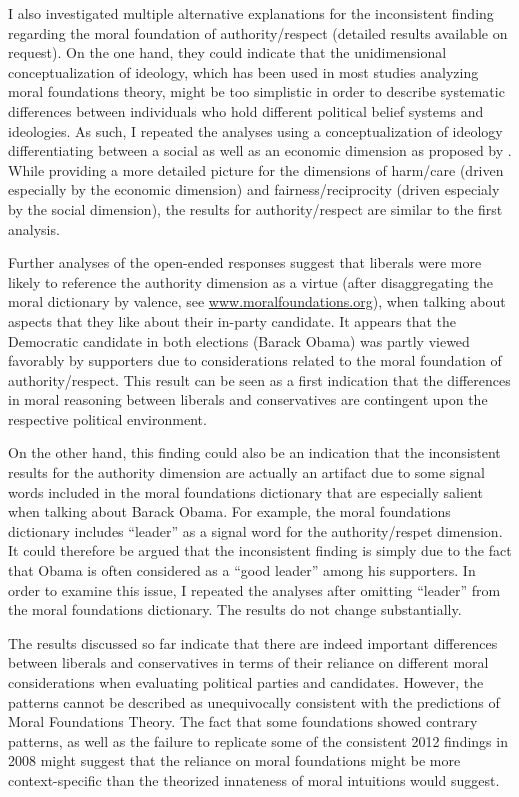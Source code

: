 \documentclass[12pt]{article}
\begin{document}
I also investigated multiple alternative explanations for the inconsistent finding regarding the moral foundation of authority/respect (detailed results available on request). On the one hand, they could indicate that the unidimensional conceptualization of ideology, which has been used in most studies analyzing moral foundations theory, might be too simplistic in order to describe systematic differences between individuals who hold different political belief systems and ideologies. As such, I repeated the analyses using a conceptualization of ideology differentiating between a social as well as an economic dimension as proposed by \citet{feldman2013understanding}. While providing a more detailed picture for the dimensions of harm/care (driven especially by the economic dimension) and fairness/reciprocity (driven especialy by the social dimension), the results for authority/respect are similar to the first analysis. 

Further analyses of the open-ended responses suggest that liberals were more likely to reference the authority dimension as a virtue (after disaggregating the moral dictionary by valence, see \url{www.moralfoundations.org}), when talking about aspects that they like about their in-party candidate. It appears that the Democratic candidate in both elections (Barack Obama) was partly viewed favorably by supporters due to considerations related to the moral foundation of authority/respect. This result can be seen as a first indication that the differences in moral reasoning between liberals and conservatives are contingent upon the respective political environment.

On the other hand, this finding could also be an indication that the inconsistent results for the authority dimension are actually an artifact due to some signal words included in the moral foundations dictionary that are especially salient when talking about Barack Obama. For example, the moral foundations dictionary includes ``leader'' as a signal word for the authority/respet dimension. It could therefore be argued that the inconsistent finding is simply due to the fact that Obama is often considered as a ``good leader'' among his supporters. In order to examine this issue, I repeated the analyses after omitting ``leader'' from the moral foundations dictionary. The results do not change substantially.

The results discussed so far indicate that there are indeed important differences between liberals and conservatives in terms of their reliance on different moral considerations when evaluating political parties and candidates. However, the patterns cannot be described as unequivocally consistent with the predictions of Moral Foundations Theory. The fact that some foundations showed contrary patterns, as well as the failure to replicate some of the consistent 2012 findings in 2008 might suggest that the reliance on moral foundations might be more context-specific than the theorized innateness of moral intuitions would suggest.
\end{document}
